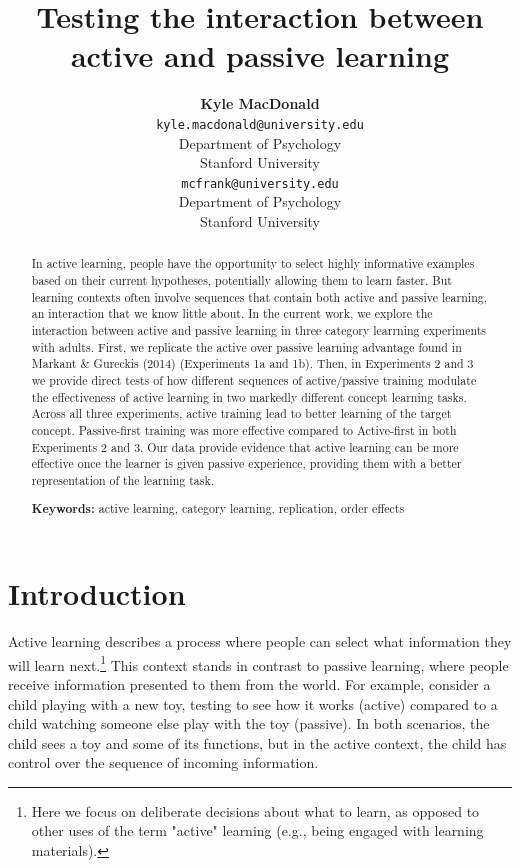 \documentclass[10pt, letterpaper]{article}
\title{Testing the interaction between active and passive learning}
\author{{\large \bf Kyle MacDonald} \\ \texttt{kyle.macdonald@university.edu} \\ Department of Psychology \\ Stanford University \And {\large \bf Michael C. Frank} \\ \texttt{mcfrank@university.edu} \\ Department of Psychology \\ Stanford University}
\begin{document}
\maketitle

\begin{abstract}
In active learning, people have the opportunity to select highly
informative examples based on their current hypotheses, potentially
allowing them to learn faster. But learning contexts often involve
sequences that contain both active and passive learning, an interaction
that we know little about. In the current work, we explore the
interaction between active and passive learning in three category
learrning experiments with adults. First, we replicate the active over
passive learning advantage found in Markant \& Gureckis (2014)
(Experiments 1a and 1b). Then, in Experiments 2 and 3 we provide direct
tests of how different sequences of active/passive training modulate the
effectiveness of active learning in two markedly different concept
learning tasks. Across all three experiments, active training lead to
better learning of the target concept. Passive-first training was more
effective compared to Active-first in both Experiments 2 and 3. Our data
provide evidence that active learning can be more effective once the
learner is given passive experience, providing them with a better
representation of the learning task.

\textbf{Keywords:}
active learning, category learning, replication, order effects
\end{abstract}

\section{Introduction}\label{introduction}

Active learning describes a process where people can select what
information they will learn
next.\footnote{Here we focus on deliberate decisions about what to learn, as opposed to other uses of the term "active" learning (e.g., being engaged with learning materials).}
This context stands in contrast to passive learning, where people
receive information presented to them from the world. For example,
consider a child playing with a new toy, testing to see how it works
(active) compared to a child watching someone else play with the toy
(passive). In both scenarios, the child sees a toy and some of its
functions, but in the active context, the child has control over the
sequence of incoming information.
\end{document}

